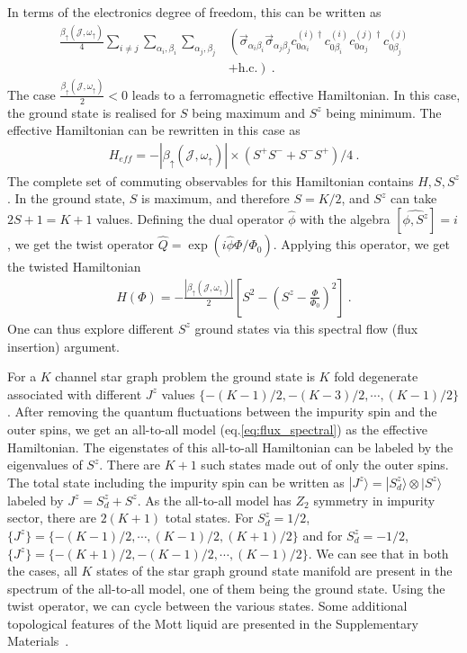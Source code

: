 \documentclass{iopart}
\begin{document}
In terms of the electronics degree of freedom, this can be written as
\begin{eqnarray}
	\frac{ \beta_{\uparrow}({\mathcal{J}},\omega_{\uparrow}) }{4}  \sum_{i\neq j}\sum_{\alpha_i,\beta_i}\sum_{\alpha_j,\beta_j}&\left(\vec{\sigma}_{\alpha_i\beta_i}\vec{\sigma}_{\alpha_j\beta_j}  c_{0\alpha_i}^{(i)\dagger}  c_{0\beta_i}^{(i)} c_{0\alpha_j}^{(j)\dagger}  c_{0\beta_j}^{(j)} \right.\nonumber\\
																   &\left. +\textrm{h.c.}\right) ~.
\label{eq:all-to-all_1}
\end{eqnarray}
The case $\frac{\beta_{\uparrow}({\mathcal{J}},\omega_{\uparrow})}{2} <0$ leads to a ferromagnetic effective Hamiltonian. In this case, the ground state is realised for $S$ being maximum and $S^z$ being minimum. The effective Hamiltonian can be rewritten in this case as
\begin{eqnarray}
H_{eff}   =-|\beta_{\uparrow}({\mathcal{J}},\omega_{\uparrow})| \times(S^+S^{-}+ S^-S^{+}) /4   ~.
\end{eqnarray}
The complete set of commuting observables for this Hamiltonian contains $H,S,S^z$. In the ground state, $S$ is maximum, and  therefore $S=K/2$, and $S^z$ can take $2S+1=K+1$ values. Defining the dual operator \(\hat \phi\) with the algebra \([\hat{\phi,S^z}]=i\), we get the twist operator $\hat{Q}=\exp(i\hat{\phi}\Phi/\Phi_0)$. Applying this operator, we get the twisted Hamiltonian 
\begin{eqnarray}
	H(\Phi) = -\frac{|\beta_{\uparrow}({\mathcal{J}},\omega_{\uparrow})|}{2} \left[S^2 - \left(S^{z}-\frac{\Phi}{\Phi_0} \right)^2\right] ~.
\label{eq:flux_spectral}
\end{eqnarray}
One can thus explore different $S^z$ ground states via this spectral flow (flux insertion) argument.

For a $K$ channel star graph problem the ground state is $K$ fold degenerate associated with different $J^z$ values $\{-(K-1)/2,-(K-3)/2,\cdots  ,(K-1)/2 \}$. After removing the quantum fluctuations between the impurity spin and the outer spins, we get an all-to-all model (eq.\eqref{eq:flux_spectral}) as the effective Hamiltonian. The eigenstates of this all-to-all Hamiltonian can be labeled by the eigenvalues of $S^z$. There are $K+1$ such states made out of only the outer spins. The total state including the impurity spin can be written as $|J^z\rangle = |S_d^z\rangle \otimes |S^z\rangle$ labeled by $J^z=S_d^z+S^z$. As the all-to-all model has $Z_2$ symmetry in impurity sector, there are $2(K+1)$ total states. For $S_d^z=1/2$, $ \{J^z\}=\{ -(K-1)/2, \cdots, (K-1)/2, (K+1)/2 \}$ and for $S_d^z=-1/2$, $\{J^z\}=\{-(K+1)/2, -(K-1)/2, \cdots,  (K-1)/2  \}$. We can see that in both the cases, all $K$ states of the star graph ground state manifold are present in the spectrum of the all-to-all model, one of them being the ground state. Using the twist operator, we can cycle between the various states. Some additional topological features of the Mott liquid are presented in the Supplementary Materials~\cite{SM}.
\end{document}
